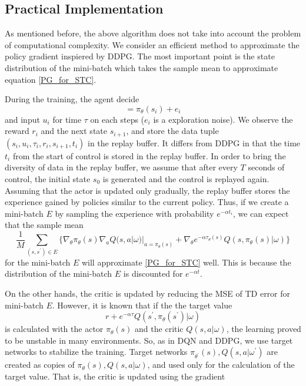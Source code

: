 \documentclass[english, dvipdfmx]{ampmt}             %
\begin{document}
\subsection{Practical Implementation}
As mentioned before, the above algorithm does not take into account the problem of computational complexity. We consider an efficient method to approximate the policy gradient inspiered by DDPG. The most important point is the state distribution of the mini-batch which takes the sample mean to approximate equation \eqref{PG_for_STC}. \par
During the training, the agent decide
\begin{equation}
	[u_i, \tau_i] = \pi_{\theta}(s_i) + e_i
\end{equation}
and input $u_i$ for time $\tau$ on each steps ($e_i$ is a exploration noise). We observe the reward $r_i$ and the next state $s_{i+1}$, and store the data tuple $(s_i, u_i, \tau_i, r_i, s_{i+1}, t_i)$ in the replay buffer. It differs from DDPG in that the time $t_i$ from the start of control is stored in the replay buffer. In order to bring the diversity of data in the replay buffer, we assume that after every $T$ seconds of control, the initial state $s_0$ is generated and the control is replayed again. Assuming that the actor is updated only gradually, the replay buffer stores the experience gained by policies similar to the current policy. Thus, if we create a mini-batch $E$ by sampling the experience with probability $e^{-\alpha t_i}$, we can expect that the sample mean
\begin{equation}
	\frac{1}{M}\sum_{(s, s^{\prime})\in E}\{\nabla_{\theta}\pi_{\theta}(s)\nabla_{a}Q(s,a|\omega)|_{a=\pi_{\theta}(s)}+\nabla_{\theta}e^{-\alpha\tau_{\theta}(s)}Q(s, \pi_{\theta}(s)|\omega)\} \label{app_pg_stc}
\end{equation}
for the mini-batch $E$ will approximate \eqref{PG_for_STC} well. This is because the distribution of the mini-batch $E$ is discounted for $e^{-\alpha t}$. \par
On the other hands, the critic is updated by reducing the MSE of TD error for mini-batch $E$. However, it is known that if the the target value 
\begin{equation}
	r + e^{-\alpha\tau}Q(s^{\prime}, \pi_{\theta}(s^{\prime})|\omega)
\end{equation}
is calculated with the actor $\pi_{\theta}(s)$ and the critic $Q(s,a|\omega)$, the learning proved to be unstable in many environments\cite{ETC}\cite{DDPG}. So, as in DQN and DDPG, we use target networks to stabilize the training. Target networks $\pi_{\theta^{\prime}}(s), Q(s,a|\omega^{\prime})$ are created as copies of $\pi_{\theta}(s), Q(s,a|\omega)$, and used only for the calculation of the target value. That is, the critic is updated using the gradient
\end{document}
